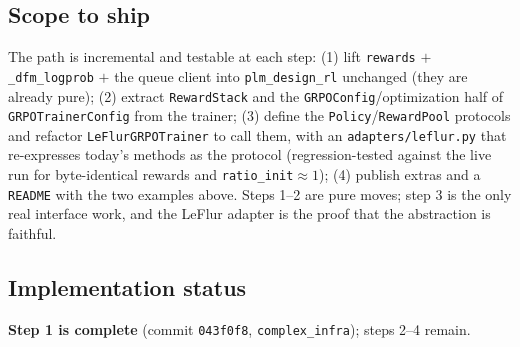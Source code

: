 \documentclass[11pt]{article}
\newcommand{\ttk}[1]{\texttt{\small #1}}
\begin{document}
\subsection{Scope to ship}
The path is incremental and testable at each step: (1) lift \ttk{rewards} $+$ \ttk{\_dfm\_logprob}
$+$ the queue client into \ttk{plm\_design\_rl} unchanged (they are already pure); (2) extract
\ttk{RewardStack} and the \ttk{GRPOConfig}/optimization half of \ttk{GRPOTrainerConfig} from the
trainer; (3) define the \ttk{Policy}/\ttk{RewardPool} protocols and refactor
\ttk{LeFlurGRPOTrainer} to call them, with an \ttk{adapters/leflur.py} that re-expresses today's
methods as the protocol (regression-tested against the live run for byte-identical rewards and
\ttk{ratio\_init}$\approx1$); (4) publish extras and a \ttk{README} with the two examples above.
Steps 1--2 are pure moves; step 3 is the only real interface work, and the LeFlur adapter is the
proof that the abstraction is faithful.

\subsection{Implementation status}
\textbf{Step 1 is complete} (commit \ttk{043f0f8}, \ttk{complex\_infra}); steps 2--4 remain.
\end{document}
